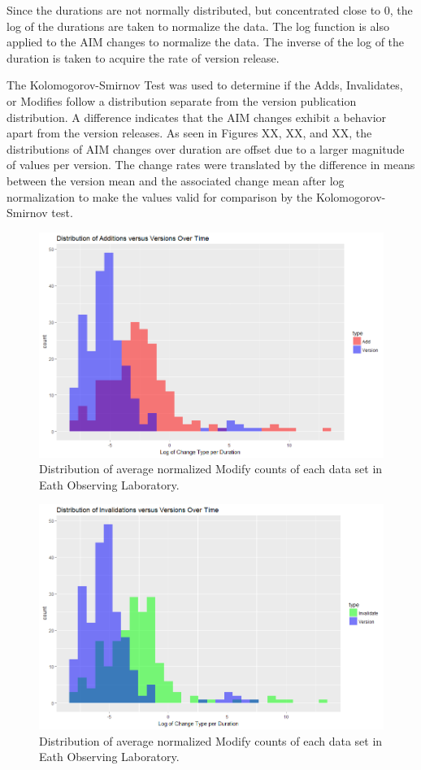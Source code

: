 Since the durations are not normally distributed, but concentrated close to 0, the log of the durations are taken to normalize the data.  
The log function is also applied to the AIM changes to normalize the data.  
The inverse of the log of the duration is taken to acquire the rate of version release.

The Kolomogorov-Smirnov Test was used to determine if the Adds, Invalidates, or Modifies follow a distribution separate from the version publication distribution.  
A difference indicates that the AIM changes exhibit a behavior apart from the version releases.  
As seen in Figures XX, XX, and XX, the distributions of AIM changes over duration are offset due to a larger magnitude of values per version.  
The change rates were translated by the difference in means between the version mean and the associated change mean after log normalization to make the values valid for comparison by the Kolomogorov-Smirnov test.

\begin{figure}%
	\centering
	\includegraphics[scale=.6]{figures/Eol_Add_Ver_Rate.png}
	\caption{Distribution of average normalized Modify counts of each data set in Eath Observing Laboratory.}
	\label{EOL_Add_Ver}
\end{figure}

\begin{figure}%
	\centering
	\includegraphics[scale=.6]{figures/Eol_Inv_Ver_Rate.png}
	\caption{Distribution of average normalized Modify counts of each data set in Eath Observing Laboratory.}
	\label{EOL_Inv_Ver}
\end{figure}

